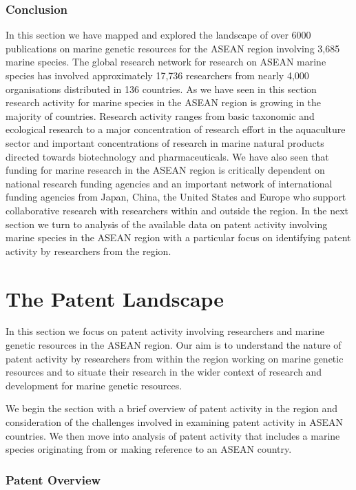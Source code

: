 \documentclass[openany]{book}
\theoremstyle{definition}
\theoremstyle{definition}
\theoremstyle{definition}
\theoremstyle{remark}
\begin{document}
\hypertarget{conclusion-1}{%
\subsection{Conclusion}\label{conclusion-1}}

In this section we have mapped and explored the landscape of over 6000
publications on marine genetic resources for the ASEAN region involving
3,685 marine species. The global research network for research on ASEAN
marine species has involved approximately 17,736 researchers from nearly
4,000 organisations distributed in 136 countries. As we have seen in
this section research activity for marine species in the ASEAN region is
growing in the majority of countries. Research activity ranges from
basic taxonomic and ecological research to a major concentration of
research effort in the aquaculture sector and important concentrations
of research in marine natural products directed towards biotechnology
and pharmaceuticals. We have also seen that funding for marine research
in the ASEAN region is critically dependent on national research funding
agencies and an important network of international funding agencies from
Japan, China, the United States and Europe who support collaborative
research with researchers within and outside the region. In the next
section we turn to analysis of the available data on patent activity
involving marine species in the ASEAN region with a particular focus on
identifying patent activity by researchers from the region.

\hypertarget{patent}{%
\chapter{The Patent Landscape}\label{patent}}

In this section we focus on patent activity involving researchers and
marine genetic resources in the ASEAN region. Our aim is to understand
the nature of patent activity by researchers from within the region
working on marine genetic resources and to situate their research in the
wider context of research and development for marine genetic resources.

We begin the section with a brief overview of patent activity in the
region and consideration of the challenges involved in examining patent
activity in ASEAN countries. We then move into analysis of patent
activity that includes a marine species originating from or making
reference to an ASEAN country.

\hypertarget{patent-overview}{%
\subsection{Patent Overview}\label{patent-overview}}
\end{document}
